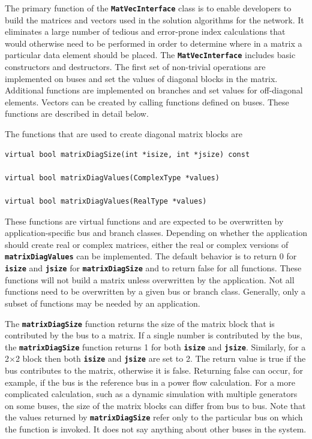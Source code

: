 \documentclass[12pt]{report} %
\begin{document}
The primary function of the \texttt{\textbf{MatVecInterface}} class is to enable developers to build the matrices and vectors used in the solution algorithms for the network. It eliminates a large number of tedious and error-prone index calculations that would otherwise need to be performed in order to determine where in a matrix a particular data element should be placed. The \texttt{\textbf{MatVecInterface}} includes basic constructors and destructors. The first set of non-trivial operations are implemented on buses and set the values of diagonal blocks in the matrix. Additional functions are implemented on branches and set values for off-diagonal elements. Vectors can be created by calling functions defined on buses. These functions are described in detail below.

The functions that are used to create diagonal matrix blocks are

{
\color{red}
\begin{Verbatim}[fontseries=b]
virtual bool matrixDiagSize(int *isize, int *jsize) const

virtual bool matrixDiagValues(ComplexType *values)

virtual bool matrixDiagValues(RealType *values)
\end{Verbatim}
}

These functions are virtual functions and are expected to be overwritten by application-specific bus and branch classes. Depending on whether the application should create real or complex matrices, either the real or complex versions of \texttt{\textbf{matrixDiagValues}} can be implemented. The default behavior is to return 0 for \texttt{\textbf{isize}} and \texttt{\textbf{jsize}} for \texttt{\textbf{matrixDiagSize}} and to return false for all functions. These functions will not build a matrix unless overwritten by the application. Not all functions need to be overwritten by a given bus or branch class. Generally, only a subset of functions may be needed by an application.

The \texttt{\textbf{matrixDiagSize}} function returns the size of the matrix block that is contributed by the bus to a matrix. If a single number is contributed by the bus, the \texttt{\textbf{matrixDiagSize}} function returns 1 for both \texttt{\textbf{isize}} and \texttt{\textbf{jsize}}. Similarly, for a 2$\mathrm{\times}$2 block then both \texttt{\textbf{isize}} and \texttt{\textbf{jsize}} are set to 2. The return value is true if the bus contributes to the matrix, otherwise it is false. Returning false can occur, for example, if the bus is the reference bus in a power flow calculation. For a more complicated calculation, such as a dynamic simulation with multiple generators on some buses, the size of the matrix blocks can differ from bus to bus. Note that the values returned by \texttt{\textbf{matrixDiagSize}} refer only to the particular bus on which the function is invoked. It does not say anything about other buses in the system.
\end{document}
